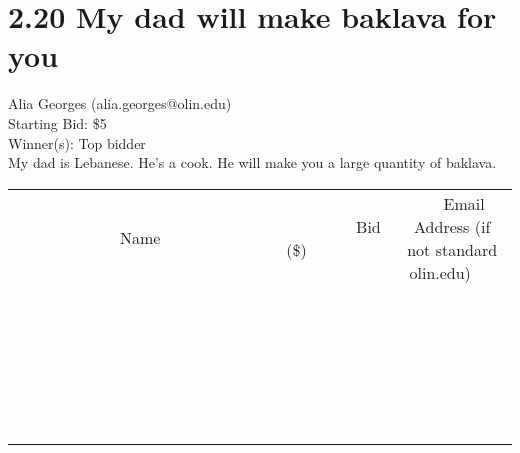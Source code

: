 \documentclass[11pt]{article}
\begin{document}
\section*{2.20 My dad will make baklava for you}
Alia Georges (alia.georges@olin.edu) \\
Starting Bid: \$5 \\
Winner(s): 
Top bidder \\
My dad is Lebanese. He's a cook. He will make you a large quantity of baklava. \\[6ex]
\begin{tabular}{c c c}
~~~~~~~~~~~~~Name~~~~~~~~~~~~~ & ~~~~~~~~~Bid (\$)~~~~~~~~~ & ~~~Email Address (if not standard olin.edu)~~~ \\
 & & \\
\hline
 & & \\
\hline
 & & \\
\hline
 & & \\
\hline
 & & \\
\hline
 & & \\
\hline
 & & \\
\hline
 & & \\
\hline
 & & \\
\hline
 & & \\
\hline
 & & \\
\hline
 & & \\
\hline
 & & \\
\hline
 & & \\
\hline
 & & \\
\hline
 & & \\
\hline
 & & \\
\hline
 & & \\
\hline
 & & \\
\hline
 & & \\
\hline
 & & \\
\hline
 & & \\
\hline
 & & \\
\hline
 & & \\
\hline
 & & \\
\hline
 & & \\
\hline
\end{tabular}
\clearpage
\end{document}
